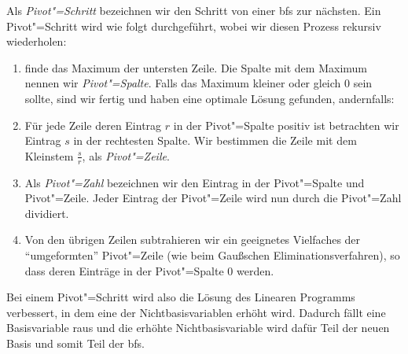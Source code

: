 Als \textit{Pivot"=Schritt} bezeichnen wir den Schritt von einer bfs zur nächsten. Ein Pivot"=Schritt wird wie folgt durchgeführt, wobei wir diesen Prozess rekursiv wiederholen:
\begin{enumerate}
  \item finde das Maximum der untersten Zeile. Die Spalte mit dem Maximum nennen wir \textit{Pivot"=Spalte}. Falls das Maximum kleiner oder gleich $0$ sein sollte, sind wir fertig und haben eine optimale Lösung gefunden, andernfalls:
  \item Für jede Zeile deren Eintrag $r$ in der Pivot"=Spalte positiv ist betrachten wir Eintrag $s$ in der rechtesten Spalte. Wir bestimmen die Zeile mit dem Kleinstem $\frac{s}{r}$, als \textit{Pivot"=Zeile}.
  \item Als \textit{Pivot"=Zahl} bezeichnen wir den Eintrag in der Pivot"=Spalte und Pivot"=Zeile. Jeder Eintrag der Pivot"=Zeile wird nun durch die Pivot"=Zahl dividiert.
  \item Von den übrigen Zeilen subtrahieren wir ein geeignetes Vielfaches der "`umgeformten"' Pivot"=Zeile (wie beim Gaußschen Eliminationsverfahren), so dass deren Einträge in der Pivot"=Spalte $0$ werden.
\end{enumerate}

Bei einem Pivot"=Schritt wird also die Lösung des Linearen Programms verbessert, in dem eine der Nichtbasisvariablen erhöht wird. Dadurch fällt eine Basisvariable raus und die erhöhte Nichtbasisvariable wird dafür Teil der neuen Basis und somit Teil der bfs. 

